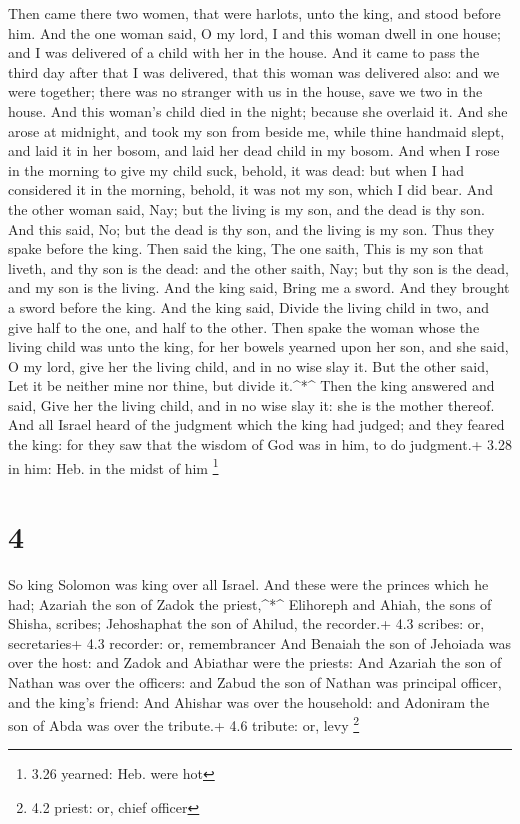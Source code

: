  Then came there two women, that were harlots, unto the
king, and stood before him.  And the one woman said, O my
lord, I and this woman dwell in one house; and I was delivered of a
child with her in the house.  And it came to pass the third
day after that I was delivered, that this woman was delivered also: and
we were together; there was no stranger with us in the house, save we
two in the house.  And this woman's child died in the
night; because she overlaid it.  And she arose at midnight,
and took my son from beside me, while thine handmaid slept, and laid it
in her bosom, and laid her dead child in my bosom.  And
when I rose in the morning to give my child suck, behold, it was dead:
but when I had considered it in the morning, behold, it was not my son,
which I did bear.  And the other woman said, Nay; but the
living is my son, and the dead is thy son. And this said, No; but the
dead is thy son, and the living is my son. Thus they spake before the
king.  Then said the king, The one saith, This is my son
that liveth, and thy son is the dead: and the other saith, Nay; but thy
son is the dead, and my son is the living.  And the king
said, Bring me a sword. And they brought a sword before the king.
 And the king said, Divide the living child in two, and
give half to the one, and half to the other.  Then spake
the woman whose the living child was unto the king, for her bowels
yearned upon her son, and she said, O my lord, give her the living
child, and in no wise slay it. But the other said, Let it be neither
mine nor thine, but divide it.\^{}*\^{}  Then the king
answered and said, Give her the living child, and in no wise slay it:
she is the mother thereof.  And all Israel heard of the
judgment which the king had judged; and they feared the king: for they
saw that the wisdom of God was in him, to do judgment.+ 3.28 in him:
Heb. in the midst of him \footnote{3.26 yearned: Heb. were hot}

\hypertarget{section-3}{%
\section{4}\label{section-3}}

 So king Solomon was king over all Israel.  And
these were the princes which he had; Azariah the son of Zadok the
priest,\^{}*\^{}  Elihoreph and Ahiah, the sons of Shisha,
scribes; Jehoshaphat the son of Ahilud, the recorder.+ 4.3 scribes: or,
secretaries+ 4.3 recorder: or, remembrancer  And Benaiah the
son of Jehoiada was over the host: and Zadok and Abiathar were the
priests:  And Azariah the son of Nathan was over the
officers: and Zabud the son of Nathan was principal officer, and the
king's friend:  And Ahishar was over the household: and
Adoniram the son of Abda was over the tribute.+ 4.6 tribute: or, levy
\footnote{4.2 priest: or, chief officer}

